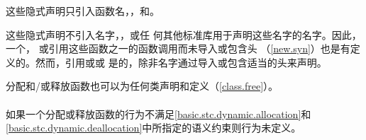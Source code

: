 这些隐式声明只引入函数名，，和。

\begin{note}
  这些隐式声明不引入名字，，或任
  何其他标准库用于声明这些名字的名字。因此，一个，
  或引用这些函数之一的函数调用而未导入或包含头
  （\ref{new.syn}）也是有定义的。然而，引用或或
  是\illform{}的，除非名字通过导入或包含适当的头来声明。
\end{note}

分配和/或释放函数也可以为任何类声明和定义（\ref{class.free}）。

\paragraph{} %
如果一个分配或释放函数的行为不满足\ref{basic.stc.dynamic.allocation}和
\ref{basic.stc.dynamic.deallocation}中所指定的语义约束则行为未定义。
